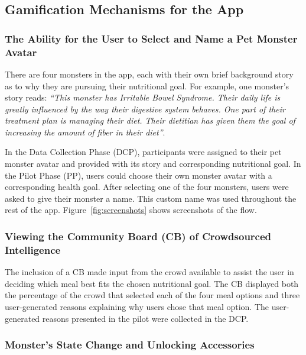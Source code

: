 \vspace{-5pt}
\subsection{Gamification Mechanisms for the App}
\subsubsection{The Ability for the User to Select and Name a Pet Monster Avatar} 
There are four monsters in the app, each with their own brief background story as to why they are pursuing their nutritional goal. 
For example, one monster's story reads: \textit{``This monster has Irritable Bowel Syndrome. Their daily life is greatly influenced by the way their digestive system behaves. One part of their treatment plan is managing their diet. Their dietitian has given them the goal of increasing the amount of fiber in their diet''}. 

In the Data Collection Phase (DCP), participants were assigned to their pet monster avatar and provided with its story and corresponding nutritional goal. In the Pilot Phase (PP), users could choose their own monster avatar with a corresponding health goal. After selecting one of the four monsters, users were asked to give their monster a name. 
This custom name was used throughout the rest of the app. Figure~\ref{fig:screenshots} shows screenshots of the flow.


\vspace{-5pt}
\subsubsection{Viewing the Community Board (CB) of Crowdsourced Intelligence}

The inclusion of a CB made input from the crowd available to assist the user in deciding which meal best fits the chosen nutritional goal. 
The CB displayed both the percentage of the crowd that selected each of the four meal options and three user-generated reasons explaining why users chose that meal option. The user-generated reasons presented in the pilot were collected in the DCP. 




\vspace{-5pt}
\subsubsection{Monster's State Change and  Unlocking Accessories} 

